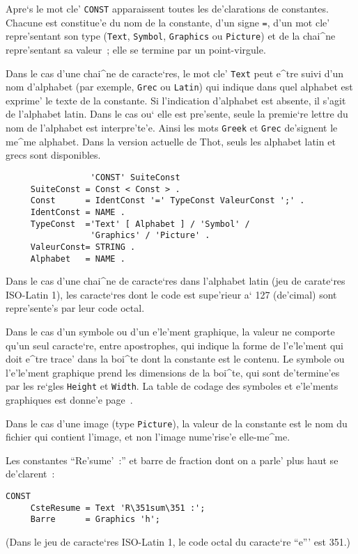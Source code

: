 {Apre`s le mot cle' {\tt CONST} apparaissent toutes les de'clarations de
constantes. Chacune est constitue'e du nom de la constante, d'un signe {\tt =},
d'un mot cle' repre'sentant son type ({\tt Text}, {\tt Symbol}, {\tt Graphics}
ou {\tt Picture}) et de la chai^ne repre'sentant sa valeur~; elle se termine
par un point-virgule.

Dans le cas d'une chai^ne de caracte`res, le mot cle' {\tt Text} peut e^tre
suivi d'un nom d'alphabet (par exemple, {\tt Grec} ou {\tt Latin}) qui
indique dans quel alphabet est exprime' le texte de la constante. Si
l'indication d'alphabet est absente, il s'agit de l'alphabet latin. Dans
le cas ou` elle est pre'sente, seule la premie`re lettre du nom de l'alphabet
est interpre'te'e. Ainsi les mots {\tt Greek} et {\tt Grec} de'signent le
me^me alphabet. Dans la version actuelle de Thot, seuls les alphabet latin
et grecs sont disponibles.

\begin{verbatim}
                 'CONST' SuiteConst
     SuiteConst = Const < Const > .
     Const      = IdentConst '=' TypeConst ValeurConst ';' .
     IdentConst = NAME .
     TypeConst  ='Text' [ Alphabet ] / 'Symbol' /
                 'Graphics' / 'Picture' .
     ValeurConst= STRING .
     Alphabet   = NAME .
\end{verbatim}

Dans le cas d'une chai^ne de caracte`res dans l'alphabet latin (jeu de
carate`res ISO-Latin 1), les caracte`res dont le code est supe'rieur a` 127
(de'cimal) sont repre'sente's par leur code octal.

Dans le cas d'un symbole ou d'un e'le'ment graphique, la valeur ne comporte
qu'un seul caracte`re, entre apostrophes, qui indique la forme de l'e'le'ment
qui doit e^tre trace' dans la boi^te dont la constante est le contenu. Le
symbole ou l'e'le'ment graphique prend les dimensions de la boi^te, qui sont
de'termine'es par les re`gles {\tt Height} et {\tt Width}. La table de codage
des symboles et e'le'ments graphiques est donne'e page~\pageref{codesymbole}.

Dans le cas d'une image (type {\tt Picture}), la valeur de la constante est le
nom du fichier qui contient l'image, et non l'image nume'rise'e elle-me^me.

\begin{example}
Les constantes ``Re'sume'~:'' et barre de fraction dont on a
parle' plus haut se de'clarent~:

\begin{verbatim}
CONST
     CsteResume = Text 'R\351sum\351 :';
     Barre      = Graphics 'h';
\end{verbatim}
(Dans le jeu de caracte`res ISO-Latin 1, le code octal du caracte`re ``e''' est
351.)
\end{example}

}
